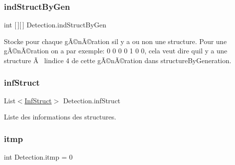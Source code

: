 \mbox{\label{class_detection_a7cffb153fd4b42ba87d6a099e31a424e}} 
\subsubsection{\texorpdfstring{ind\+Struct\+By\+Gen}{indStructByGen}}
{\footnotesize\ttfamily int \mbox{[}$\,$\mbox{]}\mbox{[}$\,$\mbox{]} Detection.\+ind\+Struct\+By\+Gen\hspace{0.3cm}{\ttfamily [private]}}



Stocke pour chaque gÃ©nÃ©ration s\textquotesingle{}il y a ou non une structure. Pour une gÃ©nÃ©ration on a par exemple\+: 0 0 0 0 1 0 0, cela veut dire qu\textquotesingle{}il y a une structure Ã  l\textquotesingle{}indice 4 de cette gÃ©nÃ©ration dans structure\+By\+Generation. 

\mbox{\label{class_detection_a33e61516c561856189732c12d7182b1e}} 
\subsubsection{\texorpdfstring{inf\+Struct}{infStruct}}
{\footnotesize\ttfamily List$<$\mbox{\hyperlink{class_inf_struct}{Inf\+Struct}}$>$ Detection.\+inf\+Struct\hspace{0.3cm}{\ttfamily [private]}}



Liste des informations des structures. 

\mbox{\label{class_detection_a8b4cfe5136dffcd0f3196db073042fbe}} 
\subsubsection{\texorpdfstring{itmp}{itmp}}
{\footnotesize\ttfamily int Detection.\+itmp = 0\hspace{0.3cm}{\ttfamily [private]}}

\mbox{\label{class_detection_a22ac4a8c7bfff75ddde6599e2868383d}} 
